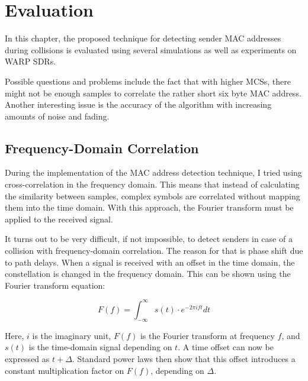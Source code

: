 
\chapter{Evaluation}\label{ch:evaluation}
\glsresetall %
 

In this chapter, the proposed technique for detecting sender \gls{MAC} addresses during collisions is evaluated using several simulations as well as experiments on \gls{WARP} \glspl{SDR}.

Possible questions and problems include the fact that with higher \glspl{MCS}, there might not be enough samples to correlate the rather short six byte \gls{MAC} address. Another interesting issue is the accuracy of the algorithm with increasing amounts of noise and fading.



\section{Frequency-Domain Correlation}\label{sec:freqd-correlation}

During the implementation of the \gls{MAC} address detection technique, I tried using cross-correlation in the frequency domain. This means that instead of calculating the similarity between samples, complex symbols are correlated without mapping them into the time domain. With this approach, the Fourier transform must be applied to the received signal.

It turns out to be very difficult, if not impossible, to detect senders in case of a collision with frequency-domain correlation. The reason for that is phase shift due to path delays. When a signal is received with an offset in the time domain, the constellation is changed in the frequency domain. This can be shown using the Fourier transform equation:

$$ F(f) = \int_{-\infty}^{\infty} s(t) \cdot e^{-2 \pi i f t} dt $$\vspace{0cm}

Here, $ i $ is the imaginary unit, $ F(f) $ is the Fourier transform at frequency $ f $, and $ s(t) $ is the time-domain signal depending on $ t $. A time offset can now be expressed as $ t + \Delta $. Standard power laws then show that this offset introduces a constant multiplication factor on $ F(f) $, depending on $ \Delta $.

